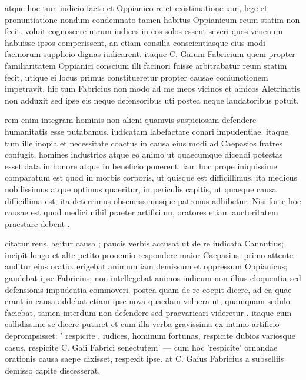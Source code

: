  atque hoc tum iudicio facto et Oppianico re et existimatione iam, lege et pronuntiatione nondum condemnato tamen habitus Oppianicum reum statim non fecit. voluit cognoscere utrum iudices in eos solos essent severi quos venenum habuisse ipsos comperissent, an etiam consilia conscientiasque eius modi facinorum supplicio dignas iudicarent. itaque C. Gaium Fabricium quem propter familiaritatem Oppianici conscium illi facinori fuisse arbitrabatur reum statim fecit, utique ei locus primus constitueretur propter causae coniunctionem impetravit. hic tum Fabricius non modo ad me meos vicinos et amicos Aletrinatis non adduxit sed ipse eis neque defensoribus uti postea neque laudatoribus potuit.

 rem enim integram hominis non alieni quamvis suspiciosam defendere humanitatis esse putabamus, iudicatam labefactare conari impudentiae. itaque tum ille inopia et necessitate coactus in causa eius modi ad Caepasios fratres confugit, homines industrios atque eo animo ut quaecumque dicendi potestas esset data in honore atque in beneficio ponerent. iam hoc prope iniquissime comparatum est quod in morbis corporis, ut quisque est difficillimus, ita medicus nobilissimus atque optimus quaeritur, in periculis capitis, ut quaeque causa difficillima est, ita deterrimus obscurissimusque patronus adhibetur. Nisi forte hoc causae est quod medici nihil praeter artificium, oratores etiam auctoritatem praestare debent .

 citatur reus, agitur causa ; paucis verbis accusat ut de re iudicata Cannutius; incipit longo et alte petito prooemio respondere maior Caepasius. primo attente auditur eius oratio. erigebat animum iam demissum et oppressum Oppianicus; gaudebat ipse Fabricius; non intellegebat animos iudicum non illius eloquentia sed defensionis impudentia commoveri. postea quam de re coepit dicere, ad ea quae erant in causa addebat etiam ipse nova quaedam volnera ut, quamquam sedulo faciebat, tamen interdum non defendere sed praevaricari videretur . itaque cum callidissime se dicere putaret et cum illa verba gravissima ex intimo artificio deprompsisset: ' respicite , iudices, hominum fortunas, respicite dubios variosque casus, respicite C. Gaii Fabrici senectutem' — cum hoc 'respicite' ornandae orationis causa saepe dixisset, respexit ipse. at C. Gaius Fabricius a subselliis demisso capite discesserat.

